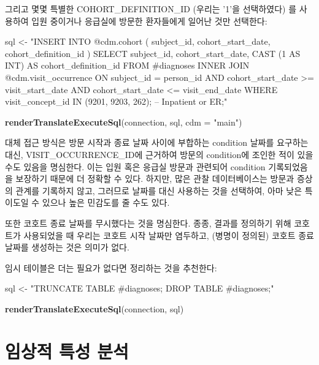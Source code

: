 \documentclass[10.5pt]{book}
\newenvironment{Shaded}{\begin{snugshade}}{\end{snugshade}}
\newcommand{\KeywordTok}[1]{\textcolor[rgb]{0.13,0.29,0.53}{\textbf{#1}}}
\newcommand{\DataTypeTok}[1]{\textcolor[rgb]{0.13,0.29,0.53}{#1}}
\newcommand{\StringTok}[1]{\textcolor[rgb]{0.31,0.60,0.02}{#1}}
\newcommand{\NormalTok}[1]{#1}
\theoremstyle{definition}
\theoremstyle{definition}
\theoremstyle{definition}
\theoremstyle{remark}
\begin{document}
그리고 몇몇 특별한 COHORT\_DEFINITION\_ID (우리는 '1'을 선택하였다) 를
사용하여 입원 중이거나 응급실에 방문한 환자들에게 일어난 것만 선택한다:

\begin{Shaded}
\begin{Highlighting}[]
\NormalTok{sql <-}\StringTok{ "INSERT INTO @cdm.cohort (}
\StringTok{  subject_id, }
\StringTok{  cohort_start_date, }
\StringTok{  cohort_definition_id}
\StringTok{  )}
\StringTok{SELECT subject_id,}
\StringTok{  cohort_start_date,}
\StringTok{  CAST (1 AS INT) AS cohort_definition_id}
\StringTok{FROM #diagnoses}
\StringTok{INNER JOIN @cdm.visit_occurrence}
\StringTok{  ON subject_id = person_id}
\StringTok{    AND cohort_start_date >= visit_start_date}
\StringTok{    AND cohort_start_date <= visit_end_date}
\StringTok{WHERE visit_concept_id IN (9201, 9203, 262); -- Inpatient or ER;"}

\KeywordTok{renderTranslateExecuteSql}\NormalTok{(connection, sql, }\DataTypeTok{cdm =} \StringTok{"main"}\NormalTok{)}
\end{Highlighting}
\end{Shaded}

대체 접근 방식은 방문 시작과 종료 날짜 사이에 부합하는 condition 날짜를
요구하는 대신, VISIT\_OCCURRENCE\_ID에 근거하여 방문의 condition에
조인한 적이 있을 수도 있음을 명심한다. 이는 입원 혹은 응급실 방문과
관련되어 condition 기록되었음을 보장하기 때문에 더 정확할 수 있다.
하지만, 많은 관찰 데이터베이스는 방문과 증상의 관계를 기록하지 않고,
그러므로 날짜를 대신 사용하는 것을 선택하여, 아마 낮은 특이도일 수
있으나 높은 민감도를 줄 수도 있다.

또한 코호트 종료 날짜를 무시했다는 것을 명심한다. 종종, 결과를 정의하기
위해 코호트가 사용되었을 때 우리는 코호트 시작 날짜만 염두하고, (병명이
정의된) 코호트 종료 날짜를 생성하는 것은 의미가 없다.

임시 테이블은 더는 필요가 없다면 정리하는 것을 추천한다:

\begin{Shaded}
\begin{Highlighting}[]
\NormalTok{sql <-}\StringTok{ "TRUNCATE TABLE #diagnoses;}
\StringTok{DROP TABLE #diagnoses;"}

\KeywordTok{renderTranslateExecuteSql}\NormalTok{(connection, sql)}
\end{Highlighting}
\end{Shaded}

\section{임상적 특성 분석}\label{Characterizationanswers}
\end{document}
